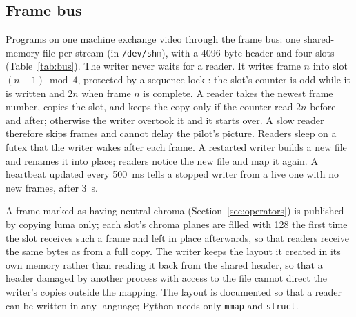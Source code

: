 \subsection{Frame bus}\label{sec:bus}

Programs on one machine exchange video through the frame bus: one
shared-memory file
per stream (in \texttt{/dev/shm}), with a 4096-byte header and four slots
(Table~\ref{tab:bus}). The writer never waits for a reader. It writes
frame $n$ into
slot $(n-1) \bmod 4$, protected by a sequence lock \cite{boehm2012}: the slot's
counter is odd while it is written and $2n$ when frame $n$ is complete. A reader
takes the newest frame number, copies the slot, and keeps the copy only if the
counter read $2n$ before and after; otherwise the writer overtook it
and it starts
over. A slow reader therefore skips frames and cannot delay the pilot's picture.
Readers sleep on a futex \cite{franke2002} that the writer wakes
after each frame. A
restarted writer builds a new file and renames it into place; readers
notice the new
file and map it again. A heartbeat updated every 500~ms tells a
stopped writer from a
live one with no new frames, after 3~s.

A frame marked as having neutral chroma (Section~\ref{sec:operators})
is published by
copying luma only; each slot's chroma planes are filled with 128 the
first time the slot
receives such a frame and left in place afterwards, so that readers
receive the same
bytes as from a full copy. The writer keeps the layout it created in
its own memory
rather than reading it back from the shared header, so that a header damaged by
another process with access to the file cannot direct the writer's
copies outside the
mapping. The layout is documented so that a reader can be written in
any language;
Python needs only \texttt{mmap} and \texttt{struct}.

